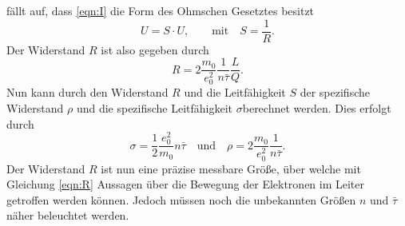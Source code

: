 fällt auf, dass \eqref{eqn:I} die Form des Ohmschen Gesetztes besitzt
\begin{equation}
    U=S\cdot U, \qquad \text{mit}\quad S=\frac{1}{R}.
\end{equation}
Der Widerstand $R$ ist also gegeben durch
\begin{equation}
    R=2\frac{m_0}{e_0^2}\frac{1}{n\bar{\tau}}\frac{L}{Q}. \label{eqn:R}
\end{equation}
Nun kann durch den Widerstand $R$ und die Leitfähigkeit $S$ der spezifische Widerstand $\rho$ und
die spezifische Leitfähigkeit $\sigma$berechnet werden. Dies erfolgt durch
\begin{equation}
    \sigma=\frac{1}{2}\frac{e_0^2}{m_0}n\bar{\tau} 
    \quad \text{und} \quad
    \rho=2\frac{m_0}{e_0^2}\frac{1}{n\bar{\tau}}.
\end{equation}
Der Widerstand $R$ ist nun eine präzise messbare Größe, über welche mit Gleichung \ref{eqn:R} Aussagen
über die Bewegung der Elektronen im Leiter getroffen werden können. Jedoch müssen noch die unbekannten
Größen $n$ und $\bar{\tau}$ näher beleuchtet werden.
